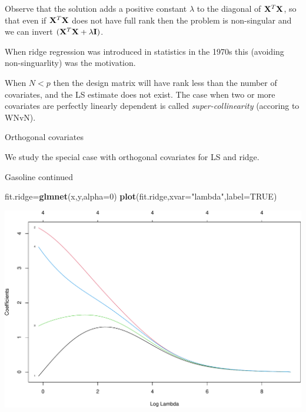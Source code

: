 \documentclass[
  ignorenonframetext,
]{beamer}
\newenvironment{Shaded}{\begin{snugshade}}{\end{snugshade}}
\newcommand{\DataTypeTok}[1]{\textcolor[rgb]{0.13,0.29,0.53}{#1}}
\newcommand{\DecValTok}[1]{\textcolor[rgb]{0.00,0.00,0.81}{#1}}
\newcommand{\KeywordTok}[1]{\textcolor[rgb]{0.13,0.29,0.53}{\textbf{#1}}}
\newcommand{\NormalTok}[1]{#1}
\newcommand{\OtherTok}[1]{\textcolor[rgb]{0.56,0.35,0.01}{#1}}
\newcommand{\StringTok}[1]{\textcolor[rgb]{0.31,0.60,0.02}{#1}}
\begin{document}
\begin{frame}

Observe that the solution adds a positive constant \(\lambda\) to the
diagonal of \({\bf X}^T{\bf X}\), so that even if \({\bf X}^T{\bf X}\)
does not have full rank then the problem is non-singular and we can
invert \(({\bf X}^T{\bf X}+\lambda {\bf I})\).

When ridge regression was introduced in statistics in the 1970s this
(avoiding non-singuarlity) was the motivation.

When \(N<p\) then the design matrix will have rank less than the number
of covariates, and the LS estimate does not exist. The case when two or
more covariates are perfectly linearly dependent is called
\emph{super-collinearity} (accoring to WNvN).

\end{frame}

\begin{frame}

\begin{block}{Orthogonal covariates}

We study the special case with orthogonal covariates for LS and ridge.

\end{block}

\end{frame}

\begin{frame}[fragile]

\begin{block}{Gasoline continued}

\begin{Shaded}
\begin{Highlighting}[]
\NormalTok{fit.ridge=}\KeywordTok{glmnet}\NormalTok{(x,y,}\DataTypeTok{alpha=}\DecValTok{0}\NormalTok{)}
\KeywordTok{plot}\NormalTok{(fit.ridge,}\DataTypeTok{xvar=}\StringTok{"lambda"}\NormalTok{,}\DataTypeTok{label=}\OtherTok{TRUE}\NormalTok{)}
\end{Highlighting}
\end{Shaded}

\includegraphics{L2_files/figure-beamer/unnamed-chunk-9-1.pdf}

\end{block}

\end{frame}
\end{document}
